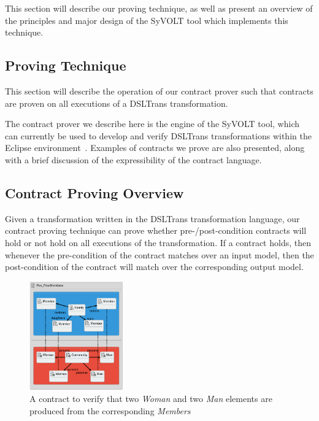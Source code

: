 This section will describe our proving technique, as well as present an overview of the principles and major design of the SyVOLT tool which implements this technique.

\subsection{Proving Technique}
This section will describe the operation of our contract prover such that contracts are proven on all executions of a
DSLTrans transformation.

The contract prover we describe here is the engine of
the SyVOLT tool, which can currently be used to develop and verify DSLTrans transformations within the Eclipse
environment~\cite{Lucio2015,syvoltTool,syvoltVideo}. Examples of contracts we prove are also presented, along with a brief discussion of the expressibility of the contract language.

\subsection{Contract Proving Overview}

Given a transformation written in the DSLTrans transformation language, our
contract proving technique can prove whether pre-\slash post-condition contracts will hold or
not hold on all executions of the transformation. If a contract holds, then whenever the pre-condition of the contract matches over an input model, then the post-condition of the contract will match over the corresponding output model.

  \begin{figure}[ht]
     \begin{center}
       \includegraphics[width=0.36\textwidth]{figures/FamToPersons/Pos_FourMembers.png}
       \caption{A contract to verify that two \emph{Woman} and two \emph{Man} elements are produced from the corresponding \emph{Members}}
       \label{fig:familyProp}
     \end{center}
     \vspace{-0.15in}
   \end{figure}

